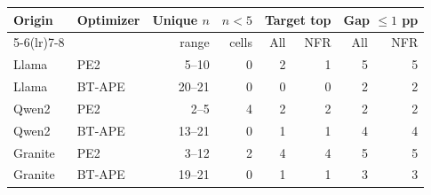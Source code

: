\begin{tabular}{llrrrrrr}
\toprule
Origin & Optimizer & Unique $n$ & $n<5$ & \multicolumn{2}{c}{Target top} & \multicolumn{2}{c}{Gap $\leq1$ pp} \\
\cmidrule(lr){5-6}\cmidrule(lr){7-8}
 & & range & cells & All & NFR & All & NFR \\
\midrule
Llama & PE2 & 5--10 & 0 & 2 & 1 & 5 & 5 \\
Llama & BT-APE & 20--21 & 0 & 0 & 0 & 2 & 2 \\
Qwen2 & PE2 & 2--5 & 4 & 2 & 2 & 2 & 2 \\
Qwen2 & BT-APE & 13--21 & 0 & 1 & 1 & 4 & 4 \\
Granite & PE2 & 3--12 & 2 & 4 & 4 & 5 & 5 \\
Granite & BT-APE & 19--21 & 0 & 1 & 1 & 3 & 3 \\
\bottomrule
\end{tabular}
